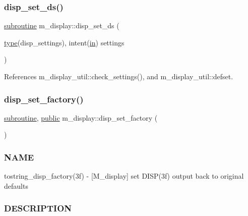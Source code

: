 \subsubsection{\texorpdfstring{disp\+\_\+set\+\_\+ds()}{disp\_set\_ds()}}
{\footnotesize\ttfamily \hyperlink{M__stopwatch_83_8txt_acfbcff50169d691ff02d4a123ed70482}{subroutine} m\+\_\+display\+::disp\+\_\+set\+\_\+ds (\begin{DoxyParamCaption}\item[{\hyperlink{stop__watch_83_8txt_a70f0ead91c32e25323c03265aa302c1c}{type}(disp\+\_\+settings), intent(\hyperlink{M__journal_83_8txt_afce72651d1eed785a2132bee863b2f38}{in})}]{settings }\end{DoxyParamCaption})\hspace{0.3cm}{\ttfamily [private]}}



References m\+\_\+display\+\_\+util\+::check\+\_\+settings(), and m\+\_\+display\+\_\+util\+::defset.

\mbox{\label{namespacem__display_a504ce34f82249882d1cc5a0ea2802bc6}} 
\subsubsection{\texorpdfstring{disp\+\_\+set\+\_\+factory()}{disp\_set\_factory()}}
{\footnotesize\ttfamily \hyperlink{M__stopwatch_83_8txt_acfbcff50169d691ff02d4a123ed70482}{subroutine}, \hyperlink{M__stopwatch_83_8txt_a2f74811300c361e53b430611a7d1769f}{public} m\+\_\+display\+::disp\+\_\+set\+\_\+factory (\begin{DoxyParamCaption}{ }\end{DoxyParamCaption})}



\subsubsection*{N\+A\+ME}

tostring\+\_\+disp\+\_\+factory(3f) -\/ \mbox{[}M\+\_\+display\mbox{]} set D\+I\+S\+P(3f) output back to original defaults 

\subsubsection*{D\+E\+S\+C\+R\+I\+P\+T\+I\+ON}

